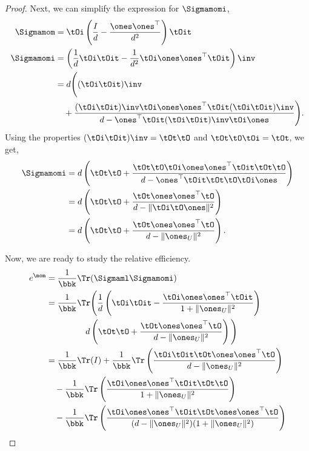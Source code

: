 \begin{proof}
Next, we can simplify the expression for $\Sigmamomi$,
\begin{align*}
    \Sigmamom &= 
      \tOi \left( \frac{I}{d} - \frac{\ones \ones^\top}{d^2} \right) \tOit \\
    \Sigmamomi &=
        \left(
        \frac{1}{d} 
          \tOi\tOit - \frac{1}{d^2} \tOi \ones \ones^\top \tOit
        \right)\inv \\
        &=
        d \Bigg(
          (\tOi\tOit)\inv \\
        &\quad
          + 
          \frac{
              (\tOi\tOit)\inv \tOi \ones \ones^\top \tOit (\tOi\tOit)\inv 
          }{
            d - \ones^\top \tOit (\tOi\tOit)\inv \tOi \ones 
          } \Bigg).
        \end{align*}
Using the properties $(\tOi\tOit)\inv = \tOt\tO$ and $\tOt\tO\tOi = \tOt$, we get,
        \begin{align*}
\Sigmamomi
          &=
        d \left(
          \tOt\tO + 
          \frac{
              \tOt\tO \tOi \ones \ones^\top \tOit \tOt\tO
          }{
            d - \ones^\top \tOit \tOt\tO \tOi \ones 
          } \right) \\
          &=
        d \left(
          \tOt\tO +
          \frac{
              \tOt \ones \ones^\top \tO
          }{
            d - \|\tOi \tO \ones\|^2 
          } \right) \\
          &=
        d \left(
          \tOt\tO +
          \frac{
              \tOt \ones \ones^\top \tO
          }{
            d - \|\ones_U\|^2 
          } \right).
\end{align*}

Now, we are ready to study the relative efficiency. 
\begin{align*}
  e^\mom &= \frac{1}{\bbk} \Tr(\Sigmaml \Sigmamomi) \\
    &= \frac{1}{\bbk}
    \Tr \Bigg( \frac{1}{d} \left(
      \tOi\tOit - \frac{\tOi \ones \ones^\top \tOit}
        {1+ \|\ones_U\|^2} 
        \right) \\
    &\quad \hphantom{\bbk \Tr}
        d
          \left(
          \tOt\tO +
          \frac{
              \tOt \ones \ones^\top \tO
          }{
            d - \|\ones_U\|^2 
          }
          \right)
          \Bigg) \\
    &= 
    \frac{1}{\bbk} \Tr(I) + \frac{1}{\bbk} \Tr\left(
          \frac{
              \tOi\tOit \tOt \ones \ones^\top \tO
          }{
            d - \|\ones_U\|^2 
          } \right) \\
    &\quad
    - \frac{1}{\bbk} \Tr\left(
      \frac{\tOi \ones \ones^\top \tOit \tOt\tO}{1+ \|\ones_U\|^2} 
      \right) \\
    &\quad
    - \frac{1}{\bbk} \Tr\left(
        \frac{\tOi \ones \ones^\top \tOit \tOt \ones \ones^\top \tO
}{(d - \|\ones_U\|^2 )(1+ \|\ones_U\|^2)} 
          \right) \\
\end{align*}


\end{proof}
